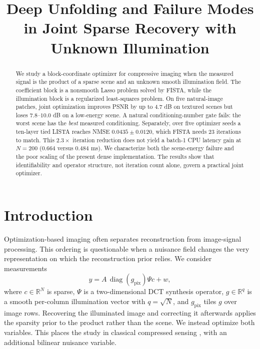 \documentclass[anon]{opt2026}
\title[Deep Unfolding and Failure Modes in Joint Sparse Recovery]
{Deep Unfolding and Failure Modes in Joint Sparse Recovery with Unknown Illumination}
\begin{document}
\maketitle

\begin{abstract}
We study a block-coordinate optimizer for compressive imaging when the measured
signal is the product of a sparse scene and an unknown smooth illumination
field.  The coefficient block is a nonsmooth Lasso problem solved by FISTA,
while the illumination block is a regularized least-squares problem.  On five
natural-image patches, joint optimization improves PSNR by up to $4.7$ dB on
textured scenes but loses $7.8$--$10.0$ dB on a low-energy scene.  A natural
conditioning-number gate fails: the worst scene has the \emph{best} measured
conditioning.  Separately, over five optimizer seeds a ten-layer tied LISTA
reaches NMSE $0.0435\mathbin{\pm}0.0120$, which FISTA needs 23 iterations to
match.  This $2.3\times$ iteration reduction does not yield a batch-1 CPU
latency gain at $N=200$ ($0.664$ versus $0.484$ ms).  We characterize both the
scene-energy failure and the poor scaling of the present dense implementation.
The results show that identifiability and operator structure, not iteration
count alone, govern a practical joint optimizer.
\end{abstract}

\section{Introduction}

Optimization-based imaging often separates reconstruction from image-signal
processing.  This ordering is questionable when a nuisance field changes the
very representation on which the reconstruction prior relies.  We consider
measurements
\begin{equation}
  y=A\,\operatorname{diag}(g_{\mathrm{pix}})\Psi c+w,
  \label{eq:forward}
\end{equation}
where $c\in\mathbb{R}^N$ is sparse, $\Psi$ is a two-dimensional DCT synthesis
operator, $g\in\mathbb{R}^{q}$ is a smooth per-column illumination vector with
$q=\sqrt{N}$, and $g_{\mathrm{pix}}$ tiles $g$ over image rows.  Recovering the
illuminated image and correcting it afterwards applies the sparsity prior to
the product rather than the scene.  We instead optimize both variables.
This places the study in classical compressed sensing
\citep{candes2006stable,donoho2006compressed}, with an additional bilinear
nuisance variable.
\end{document}
